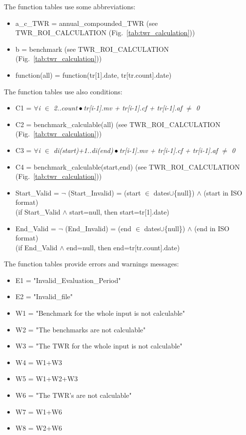 \documentclass[runningheads,12pt]{article}
\begin{document}
\bigskip
The function tables use some abbreviations:\\
\begin{itemize}
\item a\_c\_TWR = annual\_compounded\_TWR (see TWR\_ROI\_CALCULATION (Fig.~\ref{tab:twr_calculation}))\\
\item b = benchmark (see TWR\_ROI\_CALCULATION (Fig.~\ref{tab:twr_calculation}))\\
\item function(all) = function(tr[1].date, tr[tr.count].date)\\
\end{itemize}
\bigskip
\bigskip
The function tables use also conditions:\\
\begin{itemize}
\item C1 = \textit{$\forall$i $\in$ 2..count$\,\bullet\,$tr[i-1].mv + tr[i-1].cf + tr[i-1].af $\neq$ 0}\\
\item C2 = benchmark\_calculable(all) (see TWR\_ROI\_CALCULATION (Fig.~\ref{tab:twr_calculation}))\\
\item C3 = \textit{$\forall$i $\in$ di(start)+1..di(end)$\,\bullet\,$tr[i-1].mv + tr[i-1].cf + tr[i-1].af $\neq$ 0}\\
\item C4 = benchmark\_calculable(start,end) (see TWR\_ROI\_CALCULATION (Fig.~\ref{tab:twr_calculation}))\\
\item Start\_Valid = $\lnot$ (Start\_Invalid) = (start $\in$ dates$\cup$\{null\}) $\wedge$ (start in ISO format)\\
(if Start\_Valid $\wedge$ start=null, then start=tr[1].date)\\
\item End\_Valid = $\lnot$ (End\_Invalid) = (end $\in$ dates$\cup$\{null\}) $\wedge$ (end in ISO format)\\
(if End\_Valid $\wedge$ end=null, then end=tr[tr.count].date)\\


\end{itemize}
\bigskip
\bigskip
The function tables provide errors and warnings messages:\\
\begin{itemize}
\item E1 = "Invalid\_Evaluation\_Period"
\item E2 = "Invalid\_file"
\item W1 =  "Benchmark for the whole input is not calculable"
\item W2 = "The benchmarks are not calculable"
\item W3 = "The TWR for the whole input is not calculable"
\item W4 = W1+W3
\item W5 = W1+W2+W3
\item W6 = "The TWR's are not calculable"
\item W7 = W1+W6
\item W8 = W2+W6
\end{itemize}
\end{document}
